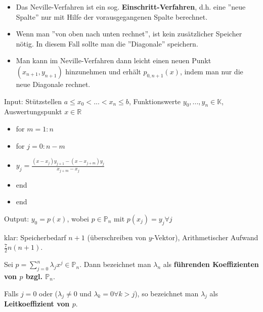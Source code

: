 \begin{remark}
	\begin{itemize}
		\item Das Neville-Verfahren ist ein sog. \textbf{Einschritt-Verfahren}, d.h. eine ''neue Spalte'' nur mit Hilfe der vorausgegangenen Spalte berechnet.
		\item Wenn man ''von oben nach unten rechnet'', ist kein zusätzlicher Speicher nötig. In diesem Fall sollte man die ''Diagonale'' speichern.
		\item Man kann im Neville-Verfahren dann leicht einen neuen Punkt $(x_{n+1}, y_{n+1})$ hinzunehmen und erhält $p_{0,n+1}(x)$, indem man nur die neue Diagonale rechnet.
	\end{itemize}
\end{remark}

\begin{algorithm}[Neville]
	Input: Stützstellen $a \leq x_0 < ... < x_n \leq b$, Funktionswerte $y_0, ..., y_n \in \mathbb{K}$, Auswertungspunkt $x \in \mathbb{R}$
	
	\begin{itemize}
		\item for $m=1:n$
		\item for $j=0:n-m$
		\item $y_j = \frac{(x-x_j)y_{j+1} - (x-x_{j+m})y_j}{x_{j+m}-x_j}$
		\item end
		\item end
	\end{itemize}
	
	Output: $y_0 = p(x)$, wobei $p \in \mathbb{P}_n$ mit $p(x_j) = y_j \forall j$
	
	klar: Speicherbedarf $n+1$ (überschreiben von $y$-Vektor), Arithmetischer Aufwand $\frac{7}{2}n(n+1)$.
\end{algorithm}

\begin{definition}
	Sei $p = \sum_{j=0}^{n} \lambda_j x^j \in \mathbb{P}_n$. Dann bezeichnet man $\lambda_n$ als \textbf{führenden Koeffizienten von $p$ bzgl. $\mathbb{P}_n$}.
	
	Falls $j=0$ oder ($\lambda_j \neq 0$ und $\lambda_k = 0 \forall k > j$), so bezeichnet man $\lambda_j$ als \textbf{Leitkoeffizient von $p$}.
\end{definition}

